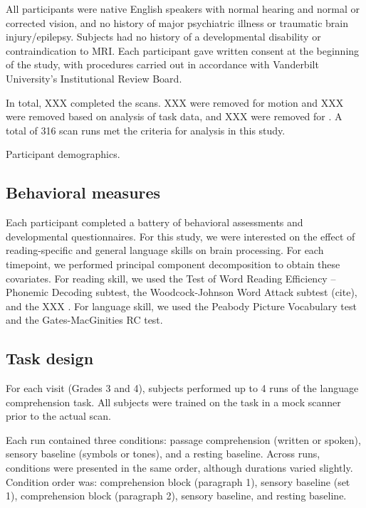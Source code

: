 All participants were native English speakers with normal hearing and normal or corrected vision, and no history of major psychiatric illness or traumatic brain injury/epilepsy. Subjects had no history of a developmental disability or contraindication to MRI.  Each participant gave written consent at the beginning of the study, with procedures carried out in accordance with Vanderbilt University’s Institutional Review Board.

In total, XXX completed the scans. XXX were removed for motion and XXX were removed based on analysis of task data, and XXX were removed for . A total of 316 scan runs met the criteria for analysis in this study.

\begin{table}
\scriptsize
\renewcommand{\tabcolsep}{0.09cm}
\centering

\caption{Participant demographics.}
\label{table:Ch2_Participants}
\end{table}

\subsection{Behavioral measures}
Each participant completed a battery of behavioral assessments and developmental questionnaires. For this study, we were interested on the effect of reading-specific and general language skills on brain processing. For each timepoint, we performed principal component decomposition to obtain these covariates. For reading skill, we used the Test of Word Reading Efficiency – Phonemic Decoding subtest, the Woodcock-Johnson Word Attack subtest (cite), and the XXX . For language skill, we used the Peabody Picture Vocabulary test and the Gates-MacGinities RC test. 

\subsection{Task design}

For each visit (Grades 3 and 4), subjects performed up to 4 runs of the language comprehension task. All subjects were trained on the task in a mock scanner prior to the actual scan. 

Each run contained three conditions: passage comprehension (written or spoken), sensory baseline (symbols or tones), and a resting baseline.  Across runs, conditions were presented in the same order, although durations varied slightly. Condition order was: comprehension block (paragraph 1), sensory baseline (set 1), comprehension block (paragraph 2), sensory baseline, and resting baseline. 

